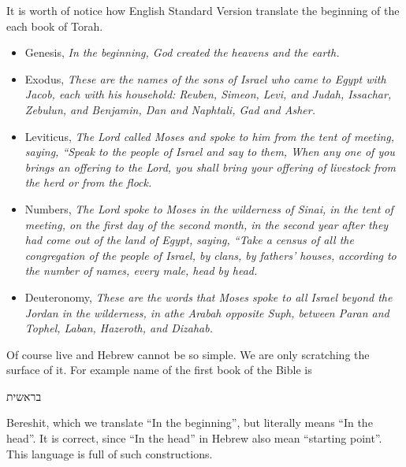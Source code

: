 \documentclass[a4paper,11pt]{article}
\begin{document}
It is worth of notice how English Standard Version translate the beginning
of the each book of Torah.

\begin{itemize}

\item Genesis, \textit{In the beginning, God created the heavens and the
    earth.}

\item Exodus, \textit{These are the names of the sons of Israel who came to
    Egypt with Jacob, each with his household: Reuben, Simeon, Levi, and
    Judah, Issachar, Zebulun, and Benjamin, Dan and Naphtali, Gad and
    Asher.}

\item Leviticus, \textit{The Lord called Moses and spoke to him from the
    tent of meeting, saying, “Speak to the people of Israel and say to
    them, When any one of you brings an offering to the Lord, you shall
    bring your offering of livestock from the herd or from the flock.}

\item Numbers, \textit{The Lord spoke to Moses in the wilderness of Sinai,
    in the tent of meeting, on the first day of the second month, in the
    second year after they had come out of the land of Egypt, saying,
    “Take a census of all the congregation of the people of Israel, by
    clans, by fathers’ houses, according to the number of names, every
    male, head by head.}

\item Deuteronomy, \textit{These are the words that Moses spoke to all
    Israel beyond the Jordan in the wilderness, in athe Arabah opposite
    Suph, between Paran and Tophel, Laban, Hazeroth, and Dizahab.}

\end{itemize}

Of course live and Hebrew cannot be so simple. We are only scratching the
surface of it. For example name of the first book of the Bible is
\begin{hebrew} בראשית \end{hebrew} Bereshit, which we translate ``In the
beginning'', but literally means ``In the head''. It is correct, since ``In
the head'' in Hebrew also mean ``starting point''. This language is full of
such constructions.
\end{document}
